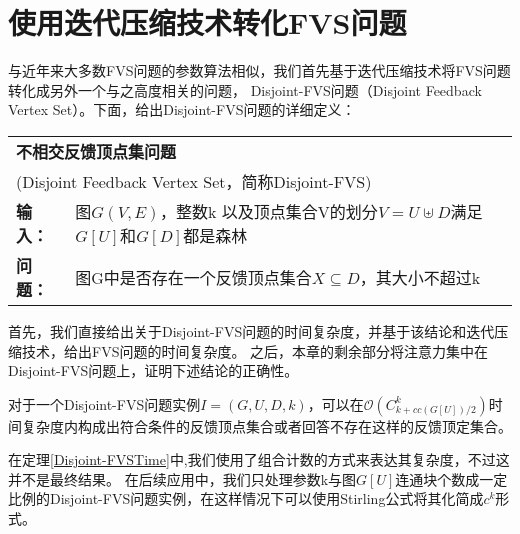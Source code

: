 \section{使用迭代压缩技术转化FVS问题}
与近年来大多数FVS问题的参数算法相似，我们首先基于迭代压缩技术将FVS问题转化成另外一个与之高度相关的问题，
Disjoint-FVS问题（Disjoint Feedback Vertex Set）。下面，给出Disjoint-FVS问题的详细定义：\\

\begin{tabular}{ | p{0.06\headwidth} p{0.80\headwidth} | }
  \hline
  \multicolumn{2}{|l|}{ \textbf{不相交反馈顶点集问题} }\\
  \multicolumn{2}{|l|}{ (Disjoint Feedback Vertex Set，简称Disjoint-FVS)}\\
  \textbf{输入：} & 图$G(V, E)$，整数k 以及顶点集合V的划分$V = U \uplus D$满足$G[U]$和$G[D]$都是森林\\
  \textbf{问题：} & 图G中是否存在一个反馈顶点集合$X \subseteq D$，其大小不超过k\\
  \hline
\end{tabular} \vspace{0.5cm}

首先，我们直接给出关于Disjoint-FVS问题的时间复杂度，并基于该结论和迭代压缩技术，给出FVS问题的时间复杂度。
之后，本章的剩余部分将注意力集中在Disjoint-FVS问题上，证明下述结论的正确性。
\begin{theorem} \label{Disjoint-FVSTime}
  对于一个Disjoint-FVS问题实例$I = (G, U, D, k)$，可以在$\mathcal{O}(C^k_{k + cc(G[U])/2})$时间复杂度内构成出符合条件的反馈顶点集合或者回答不存在这样的反馈顶定集合。
\end{theorem}

在定理\ref{Disjoint-FVSTime}中,我们使用了组合计数的方式来表达其复杂度，不过这并不是最终结果。
在后续应用中，我们只处理参数k与图$G[U]$连通块个数成一定比例的Disjoint-FVS问题实例，在这样情况下可以使用Stirling公式将其化简成$c^k$形式。

